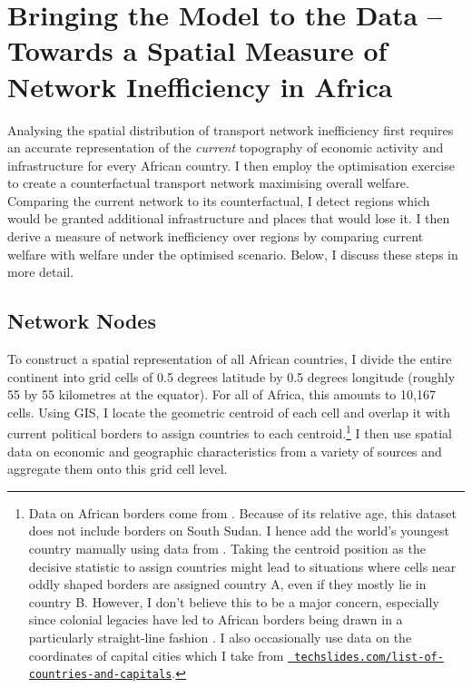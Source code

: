 \documentclass[11pt, oneside]{article}   	%
\begin{document}
\section{Bringing the Model to the Data -- Towards a Spatial Measure of Network Inefficiency in Africa}
\label{chapter:calibration}
Analysing the spatial distribution of transport network inefficiency first requires an accurate representation of the \emph{current} topography of economic activity and infrastructure for every African country. I then employ the \cite{fajgelbaum_optimal_2017} optimisation exercise to create a counterfactual transport network maximising overall welfare. Comparing the current network to its counterfactual, I detect regions which would be granted additional infrastructure and places that would lose it. I then derive a measure of network inefficiency over regions by comparing current welfare with welfare under the optimised scenario. Below, I discuss these steps in more detail.

\subsection{Network Nodes}

To construct a spatial representation of all African countries, I divide the entire continent into grid cells of 0.5 degrees latitude by 0.5 degrees longitude (roughly 55 by 55 kilometres at the equator). For all of Africa, this amounts to 10,167 cells. Using GIS, I locate the geometric centroid of each cell and overlap it with current political borders to assign countries to each centroid.\footnote{Data on African borders come from \cite{Sandvik_WorldBordersDataset_2008}. Because of its relative age, this dataset does not include borders on South Sudan. I hence add the world's youngest country manually using data from \cite{OCHA_SouthSudanAdministrative_2017}. Taking the centroid position as the decisive statistic to assign countries might lead to situations where cells near oddly shaped borders are assigned country A, even if they mostly lie in country B. However, I don't believe this to be a major concern, especially since colonial legacies have led to African borders being drawn in a particularly straight-line fashion \citep[see][]{Alesina_ArtificialStates_2011}. I also occasionally use data on the coordinates of capital cities which I take from \href{http://techslides.com/list-of-countries-and-capitals}{\texttt{ techslides.com/list-of-countries-and-capitals}}.} I then use spatial data on economic and geographic characteristics from a variety of sources and aggregate them onto this grid cell level.
\end{document}
